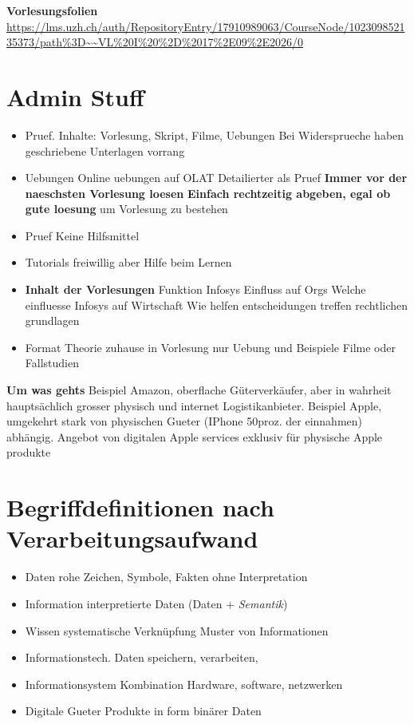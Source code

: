 
\textbf{Vorlesungsfolien} 
\url{https://lms.uzh.ch/auth/RepositoryEntry/17910989063/CourseNode/102309852135373/path%3D~~VL%20I%20%2D%2017%2E09%2E2026/0}


\section{Admin Stuff}
\begin{itemize}
    \item Pruef. Inhalte: Vorlesung, Skript, Filme, Uebungen
    \subitem Bei Widersprueche haben geschriebene Unterlagen vorrang
    \item Uebungen
     Online uebungen auf OLAT
    \subitem Detailierter als Pruef
    \subitem \textbf{Immer vor der naeschsten Vorlesung loesen} 
    \subitem \textbf{Einfach rechtzeitig abgeben, egal ob gute loesung} um Vorlesung zu bestehen
    \item Pruef
    \subitem Keine Hilfsmittel
    \item Tutorials freiwillig aber Hilfe beim Lernen
    \item \textbf{Inhalt der Vorlesungen}
        \subitem Funktion Infosys
        \subitem Einfluss auf Orgs
        \subitem Welche einfluesse Infosys auf Wirtschaft 
        \subitem Wie helfen entscheidungen treffen
        \subitem rechtlichen grundlagen 
    \item Format
        \subitem Theorie zuhause
        \subitem in Vorlesung nur Uebung und Beispiele
        \subitem Filme oder Fallstudien 
\end{itemize}

\textbf{Um was gehts}
Beispiel Amazon, oberflache Güterverkäufer, aber in wahrheit hauptsächlich grosser physisch und internet Logistikanbieter.
Beispiel Apple, umgekehrt stark von physischen Gueter (IPhone 50proz. der einnahmen) abhängig. Angebot von digitalen Apple services exklusiv für physische Apple produkte 
\pagebreak
\section{Begriffdefinitionen nach Verarbeitungsaufwand}
\begin{itemize}
    \item Daten 
        \subitem rohe Zeichen, Symbole, Fakten ohne Interpretation
    \item Information
        \subitem interpretierte Daten (Daten + \textit{Semantik}) 
    \item Wissen
        \subitem systematische Verknüpfung Muster von Informationen  
    \item Informationstech.
    \subitem Daten speichern, verarbeiten,
    \item Informationsystem
    \subitem Kombination Hardware, software, netzwerken  
    \item Digitale Gueter
        \subitem Produkte in form binärer Daten 
\end{itemize}
